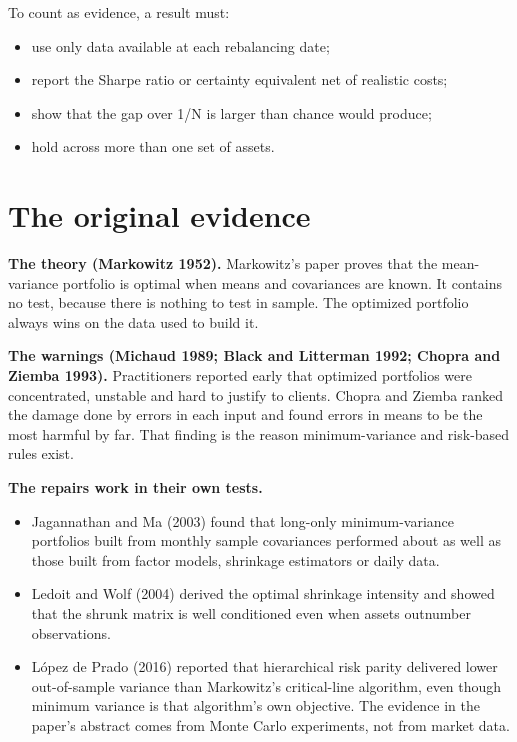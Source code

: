 To count as evidence, a result must:

\begin{itemize}
  \item use only data available at each rebalancing date;
  \item report the Sharpe ratio or certainty equivalent net of realistic costs;
  \item show that the gap over 1/N is larger than chance would produce;
  \item hold across more than one set of assets.
\end{itemize}

\section{The original evidence}
\label{sec:19-evidence}

\textbf{The theory (Markowitz 1952).} Markowitz's paper proves that the mean-variance portfolio is optimal when means and covariances are known. It contains no test, because there is nothing to test in sample. The optimized portfolio always wins on the data used to build it.

\textbf{The warnings (Michaud 1989; Black and Litterman 1992; Chopra and Ziemba 1993).} Practitioners reported early that optimized portfolios were concentrated, unstable and hard to justify to clients. Chopra and Ziemba ranked the damage done by errors in each input and found errors in means to be the most harmful by far. That finding is the reason minimum-variance and risk-based rules exist.

\textbf{The repairs work in their own tests.}

\begin{itemize}
  \item Jagannathan and Ma (2003) found that long-only minimum-variance portfolios built from monthly sample covariances performed about as well as those built from factor models, shrinkage estimators or daily data.
  \item Ledoit and Wolf (2004) derived the optimal shrinkage intensity and showed that the shrunk matrix is well conditioned even when assets outnumber observations.
  \item L\'opez de Prado (2016) reported that hierarchical risk parity delivered lower out-of-sample variance than Markowitz's critical-line algorithm, even though minimum variance is that algorithm's own objective. The evidence in the paper's abstract comes from Monte Carlo experiments, not from market data.
\end{itemize}

